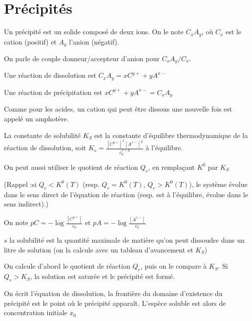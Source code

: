 \documentclass[a4paper,12pt]{book}
\newcommand{\Def}[2]{\begin{tcolorbox}[colback=white,colframe=red!10!green!20!blue!75!, title=Définition : #1]#2\end{tcolorbox}}
\newcommand{\Meth}[2]{\begin{tcolorbox}[colback=white,colframe=green!60!green!30!black!75, title=Méthode :  #1]#2\end{tcolorbox}}
\begin{document}
\section{Précipités}
\Def{}{Un précipité est un solide composé de deux ions. On le note $C_xA_y$, où $C_x$ est le cation (positif) et $A_y$ l'anion (négatif).
\par On parle de couple donneur/accepteur d'anion pour $C_xA_y/C_x$.
\par Une réaction de dissolution est $C_xA_y = xC^{y+} + yA^{x-}$
\par Une réaction de précipitation est $xC^{y+}+yA^{x-} = C_xA_y$}
Comme pour les acides, un cation qui peut être dissous une nouvelle fois est appelé un amphotère.
\Def{}{La constante de solubilité $K_S$ est la constante d'équilibre thermodynamique de la réaction de dissolution, soit $K_s = \frac{[C^{y+}]^x[A^{x-}]^y}{c_0^{x+y}}$ à l'équilibre.
\par On peut aussi utiliser le quotient de réaction $Q_r$, en remplaçant $K^0$ par $K_S$
\par (Rappel :si $Q_r<K^0(T)$ (resp. $Q_r=K^0(T)$, $Q_r>K^0(T)$), le système évolue dans le sens direct de l'équation de réaction (resp. est à l'équilibre, évolue dans le sens indirect).) 
\par On note $pC = -\log\frac{[C^{y+}]}{c_0}$ et $pA = -\log\frac{[A^{x-}]}{c_0}$
\par $s$ la solubilité est la quantité maximale de matière qu'on peut dissoudre dans un litre de solution (on la calcule avec un tableau d'avancement et $K_S$)}
\Meth{Utiliser la condition de précipitation}{On calcule d'abord le quotient de réaction $Q_r$, puis on le compare à $K_S$. Si $Q_r>K_S$, la solution est saturée et le précipité est formé.}
\Meth{Diagramme d'existence}{On écrit l'équation de dissolution, la frontière du domaine d'existence du précipité est le point où le précipité apparaît. L'espèce soluble est alors de concentration initiale $x_0$}
\end{document}
